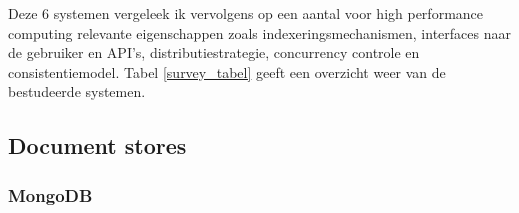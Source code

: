 \begin{landscape}

\label{survey_tabel}
\end{landscape}

\noindent Deze 6 systemen vergeleek ik 
vervolgens op een aantal voor high performance computing relevante eigenschappen zoals indexeringsmechanismen, interfaces naar de gebruiker en API's, distributiestrategie, concurrency controle en consistentiemodel. Tabel \ref{survey_tabel} geeft een overzicht weer van de bestudeerde systemen.



\subsection{Document stores}

\subsubsection{MongoDB}

